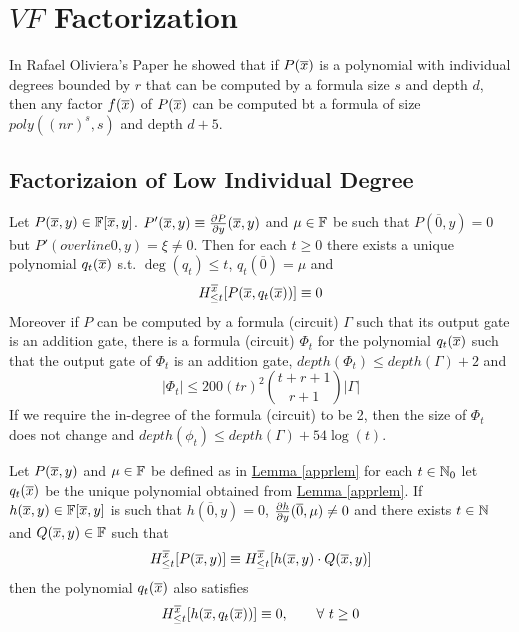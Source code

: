 \documentclass{report}
\begin{document}
\chapter{$VF$ Factorization}

In Rafael Oliviera's Paper \cite{oliveiraFactorsLowIndividual2016} he showed that if $P(\overline{x})$ is a polynomial with individual degrees bounded by $r$ that can be computed by a formula size $s$ and depth $d$, then any factor $f(\overline{x})$ of $P(\overline{x})$ can be computed bt a formula of size $poly((nr)^s,s)$ and depth $d+5$.
\section{Factorizaion of Low Individual Degree}

\begin{lemma}\label{apprlem}
	Let $P(\overline{x}, y)\in \mathbb{F}[\overline{x},y]$. $P'(\overline{x},y)\equiv \frac{\partial P}{\partial y}(\overline{x},y)$ and $\mu\in \mathbb{F}$ be such that $P(\overline{0},y)=0$ but $P'(overline{0},y)=\xi\neq 0$. Then for each $t\geq 0$ there exists a unique polynomial $q_t(\overline{x})$ s.t. $\deg(q_t)\leq t$, $q_t(\overline{0})=\mu$ and $$H_{\leq t}^{\overline{x}}[P(\overline{x},q_t(\overline{x}))]\equiv 0$$Moreover if $P$ can be computed by a formula (circuit) $\Gamma$ such that its output gate is an addition gate, there is a formula (circuit) $\Phi_t$ for the polynomial $q_t(\overline{x})$ such that the output gate of $\Phi_t$ is an addition gate, $depth(\Phi_t)\leq depth(\Gamma)+2$ and $$|\Phi_t|\leq 200(tr)^2{{t+r+1}\choose{r+1}}|\Gamma|$$If we require the in-degree of the formula (circuit) to be 2, then the size of $\Phi_t$ does not change and $depth(\phi_t)\leq depth(\Gamma)+54\log(t)$.
\end{lemma}

\begin{corollary}\label{apprrootfactor}
	Let $P(\overline{x},y)$ and $\mu\in \mathbb{F}$ be defined as in \hyperref[apprlem]{Lemma \ref{apprlem}} for each $t\in \mathbb{N}_0$ let $q_t(\overline{x})$ be the unique polynomial obtained from \hyperref[apprlem]{Lemma \ref{apprlem}}. If $h(\overline{x},y)\in \mathbb{F}[\overline{x},y]$ is such that $h(\overline{0},y)=0$, $\frac{\partial h}{\partial y}(\overline{0},\mu)\neq 0$ and there exists $t\in \mathbb{N}$ and $Q(\overline{x},y)\in \mathbb{F}$ such that 
	\begin{equation}
		H_{\leq t}^{\overline{x}}[P(\overline{x},y)]\equiv H_{\leq t}^{\overline{x}}[h(\overline{x},y)\cdot Q(\overline{x},y)]\label{apprrootfactorEq1}
	\end{equation}
	then the polynomial $q_t(\overline{x})$ also satisfies 
	\begin{equation}
		H_{\leq t}^{\overline{x}}[h(\overline{x},q_t(\overline{x}))]\equiv 0, \qquad \forall\ t\geq 0\label{apprrootfactorEq2}
	\end{equation}
\end{corollary}
\end{document}

